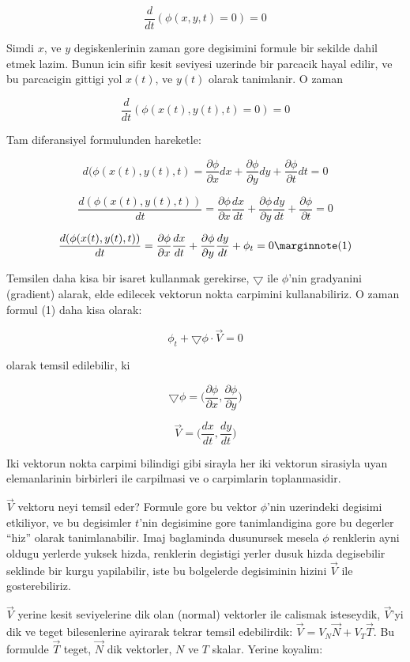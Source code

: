 \documentclass[12pt,fleqn]{article}\usepackage{../common}
\begin{document}
$$ \frac{d}{dt}(\phi(x,y,t) = 0) = 0 $$

Simdi $x$, ve $y$ degiskenlerinin zaman gore degisimini formule bir
sekilde dahil etmek lazim. Bunun icin sifir kesit seviyesi uzerinde
bir parcacik hayal edilir, ve bu parcacigin gittigi yol $x(t)$, ve
$y(t)$ olarak tanimlanir. O zaman

$$ \frac{d}{dt}(\phi(x(t),y(t),t) = 0) = 0 $$

Tam diferansiyel formulunden hareketle:

$$ 
d(\phi(x(t),y(t),t) = 
\frac{\partial \phi}{\partial x}dx + 
\frac{\partial \phi}{\partial y}dy + 
\frac{\partial \phi}{\partial t}dt  = 0
 $$

$$ 
\frac{d(\phi(x(t),y(t),t))}{dt} = 
\frac{\partial \phi}{\partial x}\frac{dx}{dt} + 
\frac{\partial \phi}{\partial y}\frac{dy}{dt} + 
\frac{\partial \phi}{\partial t} = 0
 $$

$$
\frac{d(\phi(x(t),y(t),t))}{dt} = 
\frac{\partial \phi}{\partial x}\frac{dx}{dt} + 
\frac{\partial \phi}{\partial y}\frac{dy}{dt} + 
\phi_t = 0
\mlabel{1}
$$

Temsilen daha kisa bir isaret kullanmak gerekirse, $\bigtriangledown$
ile $\phi$'nin gradyanini (gradient) alarak, elde edilecek vektorun
nokta carpimini kullanabiliriz.  O zaman formul (1) daha kisa
olarak:

$$ \phi_t + \bigtriangledown \phi \cdot \vec{V} = 0 $$

olarak temsil edilebilir, ki

$$ \bigtriangledown \phi = \bigg(
\frac{\partial \phi}{\partial x},
\frac{\partial \phi}{\partial y} \bigg)
 $$

$$ \vec{V} = \bigg(
\frac{dx}{dt} ,
\frac{dy}{dt} \bigg)
 $$

 Iki vektorun nokta carpimi bilindigi gibi sirayla her iki vektorun
 sirasiyla uyan elemanlarinin birbirleri ile carpilmasi ve o
 carpimlarin toplanmasidir.

$\vec{V}$ vektoru neyi temsil eder? Formule gore bu vektor $\phi$'nin
uzerindeki degisimi etkiliyor, ve bu degisimler $t$'nin degisimine
gore tanimlandigina gore bu degerler ``hiz'' olarak
tanimlanabilir. Imaj baglaminda dusunursek mesela $\phi$ renklerin
ayni oldugu yerlerde yuksek hizda, renklerin degistigi yerler dusuk
hizda degisebilir seklinde bir kurgu yapilabilir, iste bu bolgelerde
degisiminin hizini $\vec{V}$ ile gosterebiliriz.

$\vec{V}$ yerine kesit seviyelerine dik olan (normal) vektorler ile calismak
isteseydik, $\vec{V}$'yi dik ve teget bilesenlerine ayirarak tekrar temsil
edebilirdik: $\vec{V} = V_N\vec{N} + V_T\vec{T}$. Bu formulde $\vec{T}$ teget,
$\vec{N}$ dik vektorler, $N$ ve $T$ skalar. Yerine koyalim:
\end{document}

